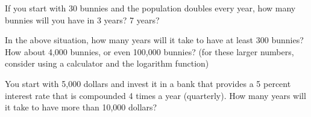 \documentclass[11pt]{amsart}
\begin{document}
If you start with 30 bunnies and the population doubles every year, how many bunnies will you have in 3 years? 7 years?
\vspace*{5em}

In the above situation, how many years will it take to have at least 300 bunnies? How about 4,000 bunnies, or even 100,000 bunnies? (for these larger numbers, consider using a calculator and the logarithm function)
\vspace*{5em}

You start with 5,000 dollars and invest it in a bank that provides a 5 percent interest rate that is compounded 4 times a year (quarterly). How many years will it take to have more than 10,000 dollars?
\end{document}
